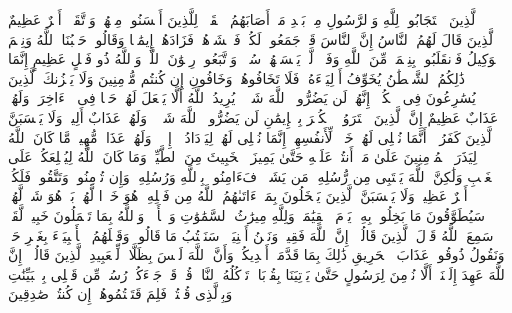 \stopbuffer%
\startbuffer[\q:3:172]
ٱلَّذِینَ ٱسۡتَجَابُوا۟ لِلَّهِ وَٱلرَّسُولِ مِنۢ بَعۡدِ مَاۤ أَصَابَهُمُ ٱلۡقَرۡحُۚ لِلَّذِینَ أَحۡسَنُوا۟ مِنۡهُمۡ وَٱتَّقَوۡا۟ أَجۡرٌ عَظِیمٌ%
\stopbuffer%
\startbuffer[\q:3:173]
ٱلَّذِینَ قَالَ لَهُمُ ٱلنَّاسُ إِنَّ ٱلنَّاسَ قَدۡ جَمَعُوا۟ لَكُمۡ فَٱخۡشَوۡهُمۡ فَزَادَهُمۡ إِیمَٰنࣰا وَقَالُوا۟ حَسۡبُنَا ٱللَّهُ وَنِعۡمَ ٱلۡوَكِیلُ%
\stopbuffer%
\startbuffer[\q:3:174]
فَٱنقَلَبُوا۟ بِنِعۡمَةࣲ مِّنَ ٱللَّهِ وَفَضۡلࣲ لَّمۡ یَمۡسَسۡهُمۡ سُوۤءࣱ وَٱتَّبَعُوا۟ رِضۡوَٰنَ ٱللَّهِۗ وَٱللَّهُ ذُو فَضۡلٍ عَظِیمٍ%
\stopbuffer%
\startbuffer[\q:3:175]
إِنَّمَا ذَٰلِكُمُ ٱلشَّیۡطَٰنُ یُخَوِّفُ أَوۡلِیَاۤءَهُۥ فَلَا تَخَافُوهُمۡ وَخَافُونِ إِن كُنتُم مُّؤۡمِنِینَ%
\stopbuffer%
\startbuffer[\q:3:176]
وَلَا یَحۡزُنكَ ٱلَّذِینَ یُسَٰرِعُونَ فِی ٱلۡكُفۡرِۚ إِنَّهُمۡ لَن یَضُرُّوا۟ ٱللَّهَ شَیۡءࣰاۗ یُرِیدُ ٱللَّهُ أَلَّا یَجۡعَلَ لَهُمۡ حَظࣰّا فِی ٱلۡءَاخِرَةِۖ وَلَهُمۡ عَذَابٌ عَظِیمٌ%
\stopbuffer%
\startbuffer[\q:3:177]
إِنَّ ٱلَّذِینَ ٱشۡتَرَوُا۟ ٱلۡكُفۡرَ بِٱلۡإِیمَٰنِ لَن یَضُرُّوا۟ ٱللَّهَ شَیۡءࣰاۖ وَلَهُمۡ عَذَابٌ أَلِیمࣱ%
\stopbuffer%
\startbuffer[\q:3:178]
وَلَا یَحۡسَبَنَّ ٱلَّذِینَ كَفَرُوۤا۟ أَنَّمَا نُمۡلِی لَهُمۡ خَیۡرࣱ لِّأَنفُسِهِمۡۚ إِنَّمَا نُمۡلِی لَهُمۡ لِیَزۡدَادُوۤا۟ إِثۡمࣰاۖ وَلَهُمۡ عَذَابࣱ مُّهِینࣱ%
\stopbuffer%
\startbuffer[\q:3:179]
مَّا كَانَ ٱللَّهُ لِیَذَرَ ٱلۡمُؤۡمِنِینَ عَلَىٰ مَاۤ أَنتُمۡ عَلَیۡهِ حَتَّىٰ یَمِیزَ ٱلۡخَبِیثَ مِنَ ٱلطَّیِّبِۗ وَمَا كَانَ ٱللَّهُ لِیُطۡلِعَكُمۡ عَلَى ٱلۡغَیۡبِ وَلَٰكِنَّ ٱللَّهَ یَجۡتَبِی مِن رُّسُلِهِۦ مَن یَشَاۤءُۖ فَءَامِنُوا۟ بِٱللَّهِ وَرُسُلِهِۦۚ وَإِن تُؤۡمِنُوا۟ وَتَتَّقُوا۟ فَلَكُمۡ أَجۡرٌ عَظِیمࣱ%
\stopbuffer%
\startbuffer[\q:3:180]
وَلَا یَحۡسَبَنَّ ٱلَّذِینَ یَبۡخَلُونَ بِمَاۤ ءَاتَىٰهُمُ ٱللَّهُ مِن فَضۡلِهِۦ هُوَ خَیۡرࣰا لَّهُمۖ بَلۡ هُوَ شَرࣱّ لَّهُمۡۖ سَیُطَوَّقُونَ مَا بَخِلُوا۟ بِهِۦ یَوۡمَ ٱلۡقِیَٰمَةِۗ وَلِلَّهِ مِیرَٰثُ ٱلسَّمَٰوَٰتِ وَٱلۡأَرۡضِۗ وَٱللَّهُ بِمَا تَعۡمَلُونَ خَبِیرࣱ%
\stopbuffer%
\startbuffer[\q:3:181]
لَّقَدۡ سَمِعَ ٱللَّهُ قَوۡلَ ٱلَّذِینَ قَالُوۤا۟ إِنَّ ٱللَّهَ فَقِیرࣱ وَنَحۡنُ أَغۡنِیَاۤءُۘ سَنَكۡتُبُ مَا قَالُوا۟ وَقَتۡلَهُمُ ٱلۡأَنۢبِیَاۤءَ بِغَیۡرِ حَقࣲّ وَنَقُولُ ذُوقُوا۟ عَذَابَ ٱلۡحَرِیقِ%
\stopbuffer%
\startbuffer[\q:3:182]
ذَٰلِكَ بِمَا قَدَّمَتۡ أَیۡدِیكُمۡ وَأَنَّ ٱللَّهَ لَیۡسَ بِظَلَّامࣲ لِّلۡعَبِیدِ%
\stopbuffer%
\startbuffer[\q:3:183]
ٱلَّذِینَ قَالُوۤا۟ إِنَّ ٱللَّهَ عَهِدَ إِلَیۡنَاۤ أَلَّا نُؤۡمِنَ لِرَسُولٍ حَتَّىٰ یَأۡتِیَنَا بِقُرۡبَانࣲ تَأۡكُلُهُ ٱلنَّارُۗ قُلۡ قَدۡ جَاۤءَكُمۡ رُسُلࣱ مِّن قَبۡلِی بِٱلۡبَیِّنَٰتِ وَبِٱلَّذِی قُلۡتُمۡ فَلِمَ قَتَلۡتُمُوهُمۡ إِن كُنتُمۡ صَٰدِقِینَ%
\stopbuffer%
\startbuffer[\q:3:184]
